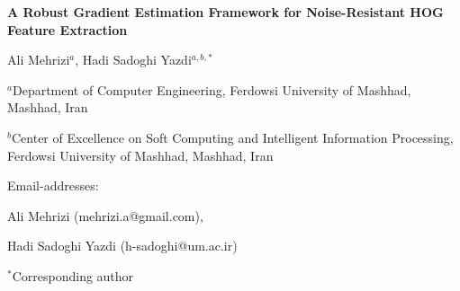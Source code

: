 \documentclass{elsarticle}
\begin{document}
\begin{titlepage}
	\begin{center}
		
		\vspace*{1cm}
		
		\textbf{A Robust Gradient Estimation Framework for Noise-Resistant HOG Feature Extraction}
		
		\vspace{1cm}
		
		Ali Mehrizi$^{a}$, Hadi Sadoghi Yazdi$^{a,b,*}$
		
		\vspace{0.7cm}
		
		$^{a}$Department of Computer Engineering, Ferdowsi University of Mashhad,
		Mashhad, Iran
		
		$^{b}$Center of Excellence on Soft Computing and Intelligent Information Processing,
		Ferdowsi University of Mashhad, Mashhad, Iran
		
	\end{center}
	
	\vspace{0.5cm}
	
	Email-addresses:
	
	Ali Mehrizi (mehrizi.a@gmail.com),
	
	Hadi Sadoghi Yazdi (h-sadoghi@um.ac.ir)
	
	\vspace{0.3cm}
	
	$^{*}$Corresponding author
	
\end{titlepage}
\end{document}
